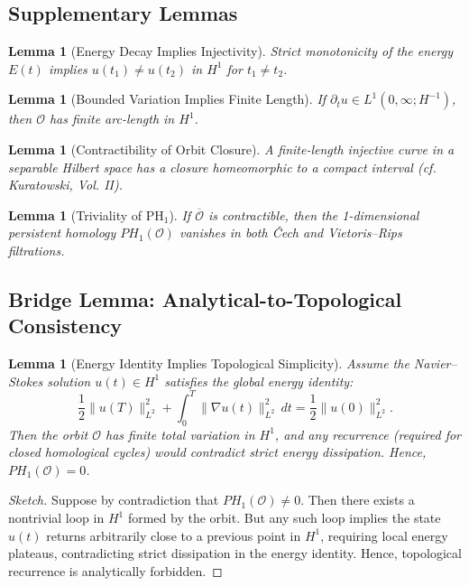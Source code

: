 \documentclass[11pt]{article}
\newtheorem{lemma}[theorem]{Lemma}
\theoremstyle{definition}
\begin{document}
\subsection*{Supplementary Lemmas}
\begin{lemma}[Energy Decay Implies Injectivity]
Strict monotonicity of the energy \( E(t) \) implies \( u(t_1) \ne u(t_2) \) in \( H^1 \) for \( t_1 \ne t_2 \).
\end{lemma}

\begin{lemma}[Bounded Variation Implies Finite Length]
If \( \partial_t u \in L^1(0,\infty; H^{-1}) \), then \( \mathcal{O} \) has finite arc-length in \( H^1 \).
\end{lemma}

\begin{lemma}[Contractibility of Orbit Closure]
A finite-length injective curve in a separable Hilbert space has a closure homeomorphic to a compact interval (cf. Kuratowski, Vol. II).
\end{lemma}

\begin{lemma}[Triviality of PH$_1$]
If \( \overline{\mathcal{O}} \) is contractible, then the 1-dimensional persistent homology \( PH_1(\mathcal{O}) \) vanishes in both Čech and Vietoris–Rips filtrations.
\end{lemma}

\subsection*{Bridge Lemma: Analytical-to-Topological Consistency}
\begin{lemma}[Energy Identity Implies Topological Simplicity]
\label{lem:energy-to-topology}
Assume the Navier–Stokes solution \( u(t) \in H^1 \) satisfies the global energy identity:
\[
\frac{1}{2} \|u(T)\|_{L^2}^2 + \int_0^T \|\nabla u(t)\|_{L^2}^2\,dt = \frac{1}{2} \|u(0)\|_{L^2}^2.
\]
Then the orbit \( \mathcal{O} \) has finite total variation in \( H^1 \), and any recurrence (required for closed homological cycles) would contradict strict energy dissipation. Hence, \( PH_1(\mathcal{O}) = 0 \).
\end{lemma}

\begin{proof}[Sketch]
Suppose by contradiction that \( PH_1(\mathcal{O}) \ne 0 \). Then there exists a nontrivial loop in \( H^1 \) formed by the orbit. But any such loop implies the state \( u(t) \) returns arbitrarily close to a previous point in \( H^1 \), requiring local energy plateaus, contradicting strict dissipation in the energy identity. Hence, topological recurrence is analytically forbidden.
\end{proof}
\end{document}
